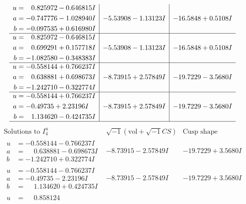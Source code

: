 \documentclass[1p]{elsarticle_modified}
\theoremstyle{definition}
\newcommand{\I}{\sqrt{-1}}
\begin{document}
$$\begin{array}{c|c|c}
\begin{aligned}
u &= \phantom{-}0.825972 - 0.646815 I \\
a &= -0.747776 - 1.028940 I \\
b &= -0.097535 + 0.616980 I\end{aligned}
 & -5.53908 - 1.13123 I & -16.5848 + 0.5108 I \\ \hline\begin{aligned}
u &= \phantom{-}0.825972 - 0.646815 I \\
a &= \phantom{-}0.699291 + 0.157718 I \\
b &= -1.082580 - 0.348383 I\end{aligned}
 & -5.53908 - 1.13123 I & -16.5848 + 0.5108 I \\ \hline\begin{aligned}
u &= -0.558144 + 0.766237 I \\
a &= \phantom{-}0.638881 + 0.698673 I \\
b &= -1.242710 - 0.322774 I\end{aligned}
 & -8.73915 + 2.57849 I & -19.7229 - 3.5680 I \\ \hline\begin{aligned}
u &= -0.558144 + 0.766237 I \\
a &= -0.49735 + 2.23196 I \\
b &= \phantom{-}1.134620 - 0.424735 I\end{aligned}
 & -8.73915 + 2.57849 I & -19.7229 - 3.5680 I\\
 \hline 
 \end{array}$$\newpage$$\begin{array}{c|c|c}  
\text{Solutions to }I^u_{4}& \I (\text{vol} + \sqrt{-1}CS) & \text{Cusp shape}\\
 \hline 
\begin{aligned}
u &= -0.558144 - 0.766237 I \\
a &= \phantom{-}0.638881 - 0.698673 I \\
b &= -1.242710 + 0.322774 I\end{aligned}
 & -8.73915 - 2.57849 I & -19.7229 + 3.5680 I \\ \hline\begin{aligned}
u &= -0.558144 - 0.766237 I \\
a &= -0.49735 - 2.23196 I \\
b &= \phantom{-}1.134620 + 0.424735 I\end{aligned}
 & -8.73915 - 2.57849 I & -19.7229 + 3.5680 I \\ \hline\begin{aligned}
u &= \phantom{-}0.858124\phantom{ +0.000000I} \\

\end{aligned}
\end{array}$$
\end{document}

